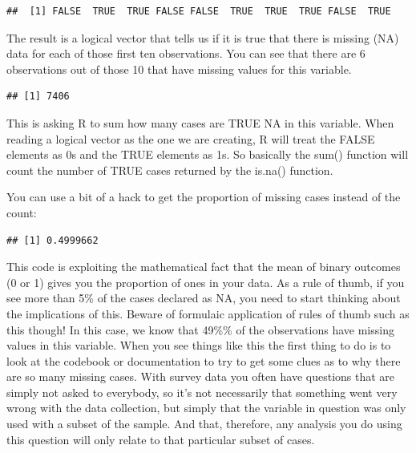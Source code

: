 \documentclass[
]{book}
\newenvironment{Shaded}{\begin{snugshade}}{\end{snugshade}}
\newcommand{\FunctionTok}[1]{\textcolor[rgb]{0.00,0.00,0.00}{#1}}
\newcommand{\NormalTok}[1]{#1}
\newcommand{\SpecialCharTok}[1]{\textcolor[rgb]{0.00,0.00,0.00}{#1}}
\begin{document}
\begin{verbatim}
##  [1] FALSE  TRUE  TRUE FALSE FALSE  TRUE  TRUE  TRUE FALSE  TRUE
\end{verbatim}

The result is a logical vector that tells us if it is true that there is missing (NA) data for each of those first ten observations. You can see that there are 6 observations out of those 10 that have missing values for this variable.

\begin{Shaded}
\end{Shaded}

\begin{verbatim}
## [1] 7406
\end{verbatim}

This is asking R to sum how many cases are TRUE NA in this variable. When reading a logical vector as the one we are creating, R will treat the FALSE elements as 0s and the TRUE elements as 1s. So basically the sum() function will count the number of TRUE cases returned by the is.na() function.

You can use a bit of a hack to get the proportion of missing cases instead of the count:

\begin{Shaded}
\end{Shaded}

\begin{verbatim}
## [1] 0.4999662
\end{verbatim}

This code is exploiting the mathematical fact that the mean of binary outcomes (0 or 1) gives you the proportion of ones in your data. As a rule of thumb, if you see more than 5\% of the cases declared as NA, you need to start thinking about the implications of this. Beware of formulaic application of rules of thumb such as this though! In this case, we know that 49\%\% of the observations have missing values in this variable. When you see things like this the first thing to do is to look at the codebook or documentation to try to get some clues as to why there are so many missing cases. With survey data you often have questions that are simply not asked to everybody, so it's not necessarily that something went very wrong with the data collection, but simply that the variable in question was only used with a subset of the sample. And that, therefore, any analysis you do using this question will only relate to that particular subset of cases.
\end{document}
